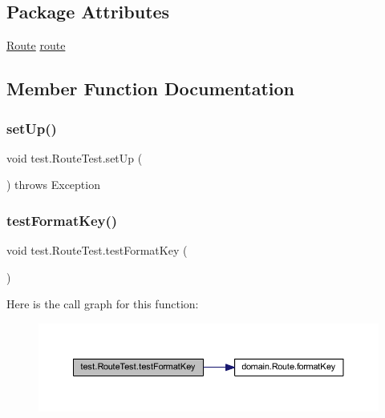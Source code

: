 \subsection*{Package Attributes}
\begin{DoxyCompactItemize}
\item 
\hyperlink{classdomain_1_1_route}{Route} \hyperlink{classtest_1_1_route_test_ab7d4418426f024512aa3dbdb1a80f605}{route}
\end{DoxyCompactItemize}


\subsection{Member Function Documentation}
\mbox{\label{classtest_1_1_route_test_a8769c6c9998f3d9ac16d3b9eba8852cb}} 
\subsubsection{\texorpdfstring{set\+Up()}{setUp()}}
{\footnotesize\ttfamily void test.\+Route\+Test.\+set\+Up (\begin{DoxyParamCaption}{ }\end{DoxyParamCaption}) throws Exception}

\mbox{\label{classtest_1_1_route_test_a8c73ab3b303390810fb4bae9740c68a5}} 
\subsubsection{\texorpdfstring{test\+Format\+Key()}{testFormatKey()}}
{\footnotesize\ttfamily void test.\+Route\+Test.\+test\+Format\+Key (\begin{DoxyParamCaption}{ }\end{DoxyParamCaption})}

Here is the call graph for this function\+:\nopagebreak
\begin{figure}[H]
\begin{center}
\leavevmode
\includegraphics[width=350pt]{classtest_1_1_route_test_a8c73ab3b303390810fb4bae9740c68a5_cgraph}
\end{center}
\end{figure}
\mbox{\label{classtest_1_1_route_test_af066f97eb9ba4d89e2c3305da7160a2b}} 
